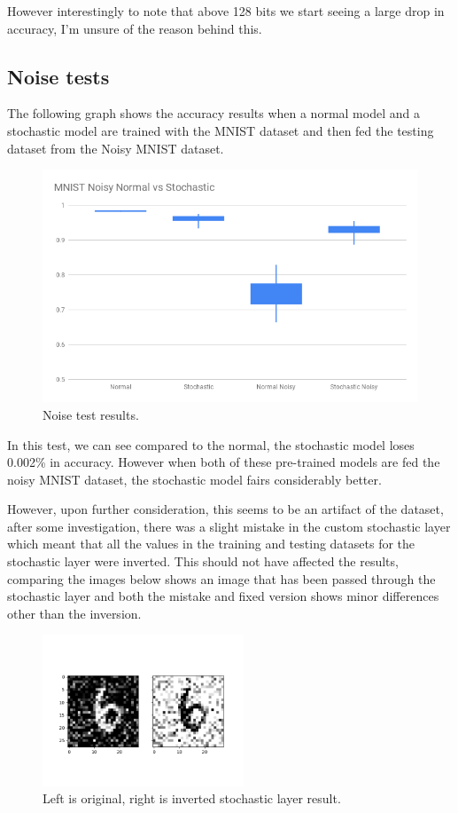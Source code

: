 \documentclass[a4paper,oneside,phd,etd]{BYUPhys}
\begin{document}
However interestingly to note that above 128 bits we start seeing a large drop in accuracy, I'm unsure of the reason behind this.

\subsection{Noise tests}
The following graph shows the accuracy results when a normal model and a stochastic model are trained with the MNIST dataset and then fed the testing dataset from the Noisy MNIST dataset.
\begin{figure}[H]
\centering
\includegraphics[width=16cm]{results/noise_test.png}
\caption{Noise test results.}
\label{fig:noise}
\end{figure}
In this test, we can see compared to the normal, the stochastic model loses 0.002\% in accuracy. However when both of these pre-trained models are fed the noisy MNIST dataset, the stochastic model fairs considerably better.

However, upon further consideration, this seems to be an artifact of the dataset, after some investigation, there was a slight mistake in the custom stochastic layer which meant that all the values in the training and testing datasets for the stochastic layer were inverted. 
This should not have affected the results, comparing the images below shows an image that has been passed through the stochastic layer and both the mistake and fixed version shows minor differences other than the inversion.
\begin{figure}[H]
\centering
\includegraphics[width=6cm]{results/stochastic_layer_pass_inverted.png}
\caption{Left is original, right is inverted stochastic layer result.}
\label{fig:noise_stochastic_inverted}
\end{figure}
\end{document}
